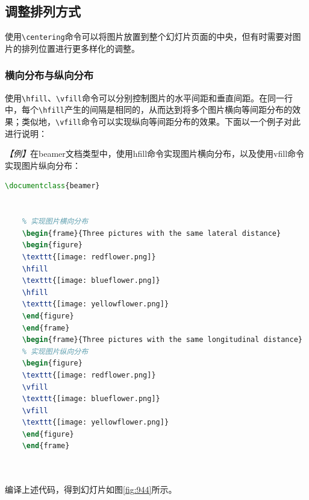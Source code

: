 \subsection{调整排列方式}

使用\texttt{\textbackslash{}centering}命令可以将图片放置到整个幻灯片页面的中央，但有时需要对图片的排列位置进行更多样化的调整。

\subsubsection{横向分布与纵向分布}

使用\texttt{\textbackslash{}hfill}、\texttt{\textbackslash{}vfill}命令可以分别控制图片的水平间距和垂直间距。在同一行中，每个\texttt{\textbackslash{}hfill}产生的间隔是相同的，从而达到将多个图片横向等间距分布的效果；类似地，\texttt{\textbackslash{}vfill}命令可以实现纵向等间距分布的效果。下面以一个例子对此进行说明：

\emph{【例】}在beamer文档类型中，使用hfill命令实现图片横向分布，以及使用vfill命令实现图片纵向分布：
\begin{lstlisting}[language=TeX]
    \documentclass{beamer}

    
    % 实现图片横向分布
    \begin{frame}{Three pictures with the same lateral distance}
    \begin{figure}
    \texttt{[image: redflower.png]}
    \hfill
    \texttt{[image: blueflower.png]}   
    \hfill
    \texttt{[image: yellowflower.png]}
    \end{figure}
    \end{frame}
    \begin{frame}{Three pictures with the same longitudinal distance}
    % 实现图片纵向分布
    \begin{figure}
    \texttt{[image: redflower.png]}
    \vfill
    \texttt{[image: blueflower.png]}   
    \vfill
    \texttt{[image: yellowflower.png]}
    \end{figure}
    \end{frame}

    
\end{lstlisting}

编译上述代码，得到幻灯片如图\ref{fig:944}所示。

